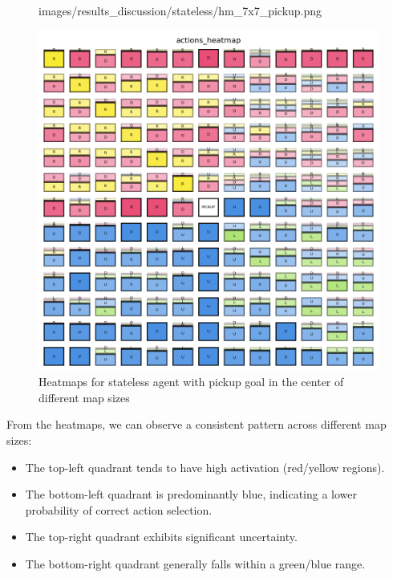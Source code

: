\begin{figure}[h]
\begin{minipage}[b]{0.32\textwidth}
{      images/results_discussion/stateless/hm_7x7_pickup.png
    }
    \caption{7x7}
    \label{fig:hm_7x7_pickup}
  \end{minipage}
  \hfill
  \begin{minipage}[b]{0.32\textwidth}
    \centering
    \includegraphics[width=\textwidth]{
      images/results_discussion/stateless/hm_13x13_pickup.png
    }
    \caption{13x13}
    \label{fig:hm_13x13_pickup}
  \end{minipage}
  \caption{Heatmaps for stateless agent with pickup goal in the center of
  different map sizes}
  \label{fig:stateless_pickup_heatmaps}
\end{figure}
\vspace{5mm}

From the heatmaps, we can observe a consistent pattern across different map
sizes:
\begin{itemize}
  \item The top-left quadrant tends to have high activation (red/yellow regions).

  \item The bottom-left quadrant is predominantly blue, indicating a lower
    probability of correct action selection.

  \item The top-right quadrant exhibits significant uncertainty.

  \item The bottom-right quadrant generally falls within a green/blue range.
\end{itemize}

